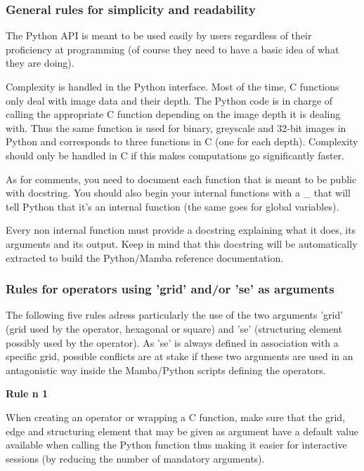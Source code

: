 \documentclass[a4paper,10pt,oneside]{article}
\begin{document}
\subsubsection{General rules for simplicity and readability}

The Python API is meant to be used easily by users regardless of their
proficiency at programming (of course they need to have a basic idea of what
they are doing).

Complexity is handled in the Python interface. Most of the time, C functions
only deal with image data and their depth. The Python code is in charge of 
calling the appropriate C function depending on the image depth it is 
dealing with. Thus the same function is used for binary, greyscale and 32-bit
images in Python and corresponds to three functions in C (one for
each depth). Complexity should only be handled in C if this makes
computations go significantly faster.

As for comments, you need to document each function that is meant
to be public with docstring. You should also begin your internal functions
with a \textquotedbl{}\_\textquotedbl{} that will tell Python that
it's an internal function (the same goes for global variables).

Every non internal function must provide a docstring explaining what it does,
its arguments and its output. Keep in mind that this docstring will be
automatically extracted to build the Python/Mamba reference documentation.

\subsubsection{Rules for operators using 'grid' and/or 'se' as arguments}

The following five rules adress particularly the use of the two arguments 'grid'
(grid used by the operator, hexagonal or square) and 'se' (structuring element
possibly used by the operator). As 'se' is always defined in association with a
specific grid, possible conflicts are at stake if these two arguments are used
in an antagonistic way inside the Mamba/Python scripts defining the operators.\par

\textbf{Rule n\textdegree{} 1}

When creating an operator or wrapping a C function, make sure that the grid, edge
and structuring element that may be given as argument have a default value
available when calling the Python function thus making it easier for
interactive sessions (by reducing the number of mandatory arguments).
\end{document}
